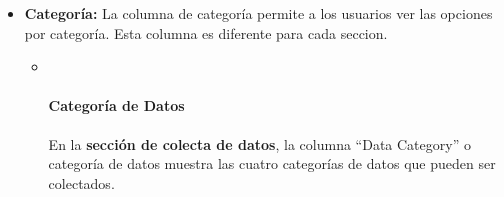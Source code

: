 \documentclass[
  11pt,
]{book}
\providecommand{\tightlist}{%
  \setlength{\itemsep}{0pt}\setlength{\parskip}{0pt}}
\begin{document}
\begin{itemize}
\tightlist
\item
  \textbf{Categoría:} La columna de categoría permite a los usuarios ver las opciones por categoría. Esta columna es diferente para cada seccion.

  \begin{itemize}
  \item ~
    \hypertarget{Data-Categories}{%
    \paragraph{Categoría de Datos}\label{Data-Categories}}

    En la \textbf{sección de colecta de datos}, la columna ``Data Category'' o categoría de datos muestra las cuatro categorías de datos que pueden ser colectados.


\end{itemize}
\end{itemize}
\end{document}

